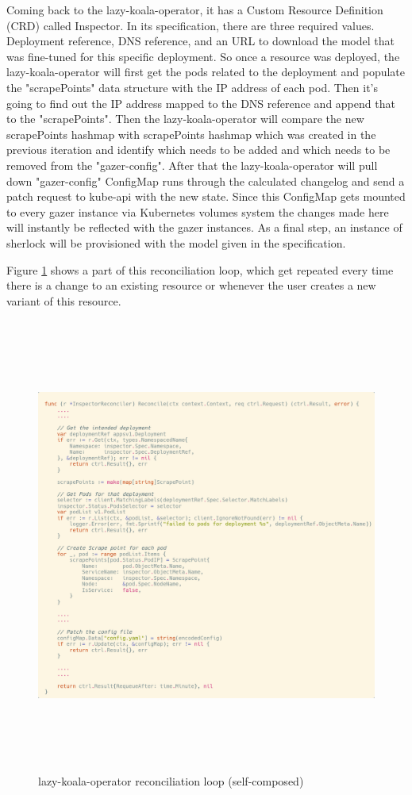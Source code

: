 Coming back to the \ac{lazy-koala-operator}, it has a Custom Resource Definition (CRD) called Inspector. In its specification, there are three required values. Deployment reference, DNS reference, and an URL to download the model that was fine-tuned for this specific deployment. So once a resource was deployed, the \ac{lazy-koala-operator} will first get the pods related to the deployment and populate the "scrapePoints" data structure with the IP address of each pod. Then it's going to find out the IP address mapped to the DNS reference and append that to the "scrapePoints". Then the \ac{lazy-koala-operator} will compare the new scrapePoints hashmap with scrapePoints hashmap which was created in the previous iteration and identify which needs to be added and which needs to be removed from the "gazer-config". After that the \ac{lazy-koala-operator} will pull down "gazer-config" ConfigMap runs through the calculated changelog and send a patch request to kube-api with the new state. Since this ConfigMap gets mounted to every \ac{gazer} instance via Kubernetes volumes system the changes made here will instantly be reflected with the \ac{gazer} instances. As a final step, an instance of \ac{sherlock} will be provisioned with the model given in the specification.

Figure \ref{fig:reconcile-loop} shows a part of this reconciliation loop, which get repeated every time there is a change to an existing resource or whenever the user creates a new variant of this resource.

\begin{figure}[H]
    \includegraphics[height=15cm]{assets/implementation/reconcile-loop.png}
    \caption{\ac{lazy-koala-operator} reconciliation loop (self-composed)}
    \label{fig:reconcile-loop}
\end{figure}



